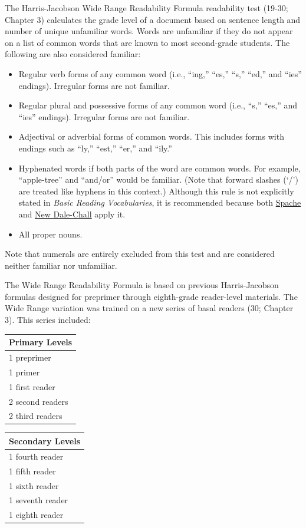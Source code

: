 \documentclass[
]{book}
\providecommand{\tightlist}{%
  \setlength{\itemsep}{0pt}\setlength{\parskip}{0pt}}
\theoremstyle{definition}
\theoremstyle{definition}
\theoremstyle{definition}
\theoremstyle{definition}
\theoremstyle{remark}
\begin{document}
The Harris-Jacobson Wide Range Readability Formula readability test (19-30; Chapter 3) calculates the grade level of a document based on sentence length and number of unique unfamiliar words. Words are unfamiliar if they do not appear on a list of common words that are known to most second-grade students. The following are also considered familiar:

\begin{itemize}
\tightlist
\item
  Regular verb forms of any common word (i.e., ``ing,'' ``es,'' ``s,'' ``ed,'' and ``ies'' endings). Irregular forms are not familiar.
\item
  Regular plural and possessive forms of any common word (i.e., ``s,'' ``es,'' and ``ies'' endings). Irregular forms are not familiar.
\item
  Adjectival or adverbial forms of common words. This includes forms with endings such as ``ly,'' ``est,'' ``er,'' and ``ily.''
\item
  Hyphenated words if both parts of the word are common words. For example, ``apple-tree'' and ``and/or'' would be familiar. (Note that forward slashes (`/') are treated like hyphens in this context.) Although this rule is not explicitly stated in \emph{Basic Reading Vocabularies}, it is recommended because both \protect\hyperlink{spache-test}{Spache} and \protect\hyperlink{dale-chall-test}{New Dale-Chall} apply it.
\item
  All proper nouns.
\end{itemize}

Note that numerals are entirely excluded from this test and are considered neither familiar nor unfamiliar.

The Wide Range Readability Formula is based on previous Harris-Jacobson formulas designed for preprimer through eighth-grade reader-level materials. The Wide Range variation was trained on a new series of basal readers (30; Chapter 3). This series included:

\begin{table}

\centering
\begin{tabular}[t]{l}
\toprule
Primary Levels\\
\midrule
1 preprimer\\
1 primer\\
1 first reader\\
2 second readers\\
2 third readers\\
\bottomrule
\end{tabular}
\centering
\begin{tabular}[t]{l}
\toprule
Secondary Levels\\
\midrule
1 fourth reader\\
1 fifth reader\\
1 sixth reader\\
1 seventh reader\\
1 eighth reader\\
\bottomrule
\end{tabular}
\end{table}
\end{document}
